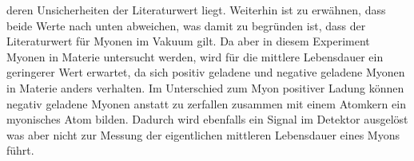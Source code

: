 deren Unsicherheiten der Literaturwert liegt. Weiterhin ist zu erwähnen, dass beide Werte nach unten abweichen, was damit zu begründen ist, dass der Literaturwert
für Myonen im Vakuum gilt. Da aber in diesem Experiment Myonen in Materie untersucht werden, wird für die mittlere Lebensdauer ein geringerer Wert erwartet, da
sich positiv geladene  und negative geladene Myonen in Materie anders verhalten. Im Unterschied zum Myon positiver Ladung können negativ geladene Myonen anstatt zu
zerfallen zusammen mit einem Atomkern ein myonisches Atom bilden. Dadurch wird ebenfalls ein Signal im Detektor ausgelöst was aber nicht zur Messung der
eigentlichen mittleren Lebensdauer eines Myons führt.
